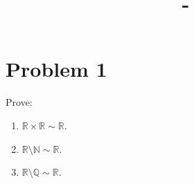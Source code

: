 \documentclass[answers,12pt,addpoints]{exam}
\author{\name}
\title{\course \ - \assignment}
\begin{document}
\maketitle

\newpage

\section*{Problem 1}
Prove:
\begin{enumerate}
    \item $\mathbb{R} \times \mathbb{R} \sim \mathbb{R}$.
    \item $\mathbb{R} \setminus \mathbb{N} \sim \mathbb{R}$.
    \item $\mathbb{R} \setminus \mathbb{Q} \sim \mathbb{R}$.
\end{enumerate}
\end{document}
